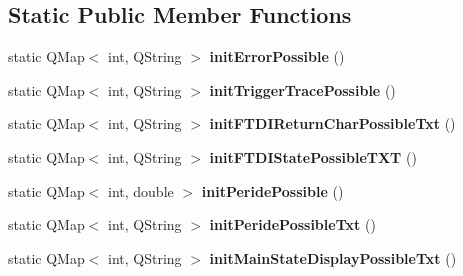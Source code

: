 \subsection*{Static Public Member Functions}
\begin{DoxyCompactItemize}
\item 
\mbox{\label{class_global_enumated_and_extern_afd5ccc14ffb855c35d6b699805509b0e}} 
static Q\+Map$<$ int, Q\+String $>$ {\bfseries init\+Error\+Possible} ()
\item 
\mbox{\label{class_global_enumated_and_extern_a7c1b1ebfd4f274ab65cac16e02d041d6}} 
static Q\+Map$<$ int, Q\+String $>$ {\bfseries init\+Trigger\+Trace\+Possible} ()
\item 
\mbox{\label{class_global_enumated_and_extern_a4fa9c09cf608cd1ddd7a8c50f382b8f9}} 
static Q\+Map$<$ int, Q\+String $>$ {\bfseries init\+F\+T\+D\+I\+Return\+Char\+Possible\+Txt} ()
\item 
\mbox{\label{class_global_enumated_and_extern_ac1d88b3ae956f8650da214fcfb036e7c}} 
static Q\+Map$<$ int, Q\+String $>$ {\bfseries init\+F\+T\+D\+I\+State\+Possible\+T\+XT} ()
\item 
\mbox{\label{class_global_enumated_and_extern_a4fa8170ab5b9cba44a3d62d9b46b9fb9}} 
static Q\+Map$<$ int, double $>$ {\bfseries init\+Peride\+Possible} ()
\item 
\mbox{\label{class_global_enumated_and_extern_a2290571e9262c866097b96885b56eade}} 
static Q\+Map$<$ int, Q\+String $>$ {\bfseries init\+Peride\+Possible\+Txt} ()
\item 
\mbox{\label{class_global_enumated_and_extern_ad7edac52fecb3c0d396d0780f3681e89}} 
static Q\+Map$<$ int, Q\+String $>$ {\bfseries init\+Main\+State\+Display\+Possible\+Txt} ()
\end{DoxyCompactItemize}

